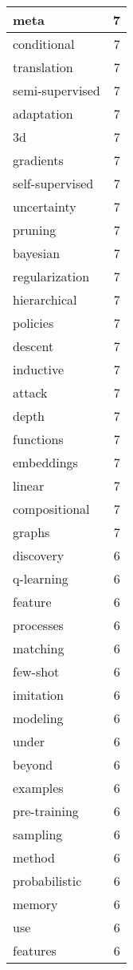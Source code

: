 \begin{table}[h]
\begin{tabular}{|l|r|}
\hline
meta & 7 \\
\hline
conditional & 7 \\
\hline
translation & 7 \\
\hline
semi-supervised & 7 \\
\hline
adaptation & 7 \\
\hline
3d & 7 \\
\hline
gradients & 7 \\
\hline
self-supervised & 7 \\
\hline
uncertainty & 7 \\
\hline
pruning & 7 \\
\hline
bayesian & 7 \\
\hline
regularization & 7 \\
\hline
hierarchical & 7 \\
\hline
policies & 7 \\
\hline
descent & 7 \\
\hline
inductive & 7 \\
\hline
attack & 7 \\
\hline
depth & 7 \\
\hline
functions & 7 \\
\hline
embeddings & 7 \\
\hline
linear & 7 \\
\hline
compositional & 7 \\
\hline
graphs & 7 \\
\hline
discovery & 6 \\
\hline
q-learning & 6 \\
\hline
feature & 6 \\
\hline
processes & 6 \\
\hline
matching & 6 \\
\hline
few-shot & 6 \\
\hline
imitation & 6 \\
\hline
modeling & 6 \\
\hline
under & 6 \\
\hline
beyond & 6 \\
\hline
examples & 6 \\
\hline
pre-training & 6 \\
\hline
sampling & 6 \\
\hline
method & 6 \\
\hline
probabilistic & 6 \\
\hline
memory & 6 \\
\hline
use & 6 \\
\hline
features & 6 \\

\end{tabular}
\end{table}
